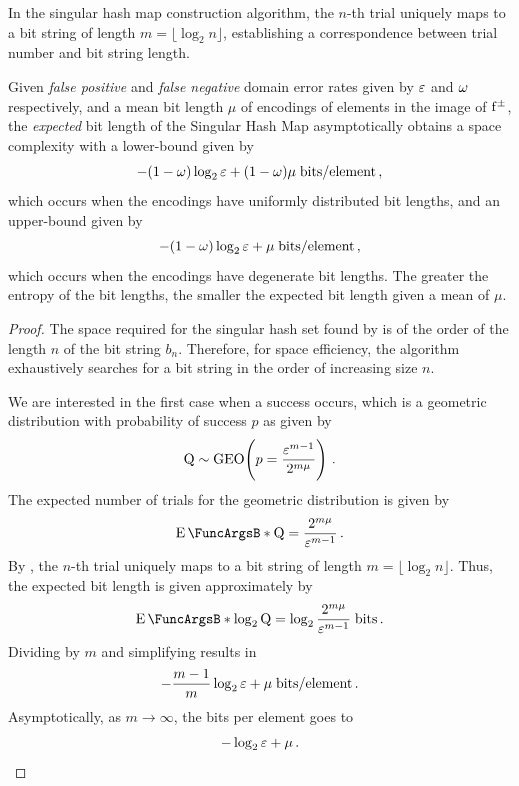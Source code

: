 \documentclass[11pt,final,hidelinks]{article}
\begin{document}
\begin{definition}
\label{def:mapping}
In the singular hash map construction algorithm, the $n$-th trial uniquely maps to a bit string of length $m = \lfloor \log_2 n \rfloor$, establishing a correspondence between trial number and bit string length.
\end{definition}

\begin{theorem}
Given \emph{false positive} and \emph{false negative} domain error rates given by $\fprate$ and $\fnrate$ respectively, and a mean bit length $\mu$ of encodings of elements in the image of $\APFun{f}$, the \emph{expected} bit length of the Singular Hash Map asymptotically obtains a space complexity with a lower-bound given by
\begin{equation}
    -(1 - \fnrate) \log_2 \fprate + (1 - \fnrate) \mu \; \si{bits \per element}\,,
\end{equation}
which occurs when the encodings have uniformly distributed bit lengths, and an upper-bound given by
\begin{equation}
    -(1 - \fnrate) \log_2 \fprate + \mu \; \si{bits \per element}\,,
\end{equation}
which occurs when the encodings have degenerate bit lengths. The greater the entropy of the bit lengths, the smaller the expected bit length given a mean of $\mu$. 
\end{theorem}
\begin{proof}
The space required for the singular hash set found by  is of the order of the length $n$ of the bit string $b_n$.
Therefore, for space efficiency, the algorithm exhaustively searches for a bit string in the order of increasing size $n$.

We are interested in the first case when a success occurs, which is a geometric distribution with probability of success $p$ as given by
\begin{equation}
    \RV{Q} \sim \geodist\!\left(p = \frac{\fprate^{m-1}}{2^{m \mu}}\right)\,.
\end{equation}
The expected number of trials for the geometric distribution is given by
\begin{equation}
\label{eq:exp_trials}
    \Expect{\RV{Q}} = \frac{2^{m \mu}}{\fprate^{m-1}}\,.
\end{equation}
By , the $n$-th trial uniquely maps to a bit string of length $m = \lfloor \log_2 n \rfloor$.
Thus, the expected bit length is given approximately by
\begin{equation}
    \Expect{\log_2 \RV{Q}} = \log_2 \frac{2^{m \mu}}{\fprate^{m-1}}\; \si{bits}\,.
\end{equation}
Dividing by $m$ and simplifying results in
\begin{equation}
    -\frac{m-1}{m} \log_2 \fprate + \mu\; \si{bits \per element}\,.
\end{equation}
Asymptotically, as $m \to \infty$, the bits per element goes to
\begin{equation}
    -\log_2 \fprate + \mu\,.
\end{equation}
\end{proof}
\end{document}
